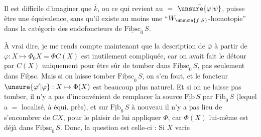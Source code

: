 Il est difficile d'imaginer que $\bar k$, ou ce qui revient au $=$ $\bar{\unsure{\varphi|\psi}}$, puisse être une équivalence, sans qu'il existe au moins une ``$W_{\unsure{f|S}}$-homotopie''
dans la catégorie des endofoncteurs de $\underline{\mathrm{Fibsc}}_0\,S$. 

À vrai dire, je me rends compte maintenant que la description de $\bar\varphi$ à partir de $\varphi:X\longmapsto\Phi_0 X=\Phi C(X)$ est inutilement compliquée, car on avait fait le détour par $C(X)$ uniquement pour être sûr de tomber dans $\underline{\mathrm{Fibsc}}_0\,S$, pas seulement dans $\underline{\mathrm{Fibsc}}$.
Mais si on laisse tomber $\underline{\mathrm{Fibsc}}_0\,S$, on s'en fout, et le foncteur $\unsure{\varphi'|\varphi}:X\mapsto\Phi(X)$ est beaucoup plus naturel. Et  si on ne laisse pas tomber, il n'y a pas d'inconvénient de remplacer la source $\underline{\mathrm{Fib}}\,S$
par $\underline{\mathrm{Fib}}_0\,S$ (lequel a $=$ localisé, à équi. près), et sur $\underline{\mathrm{Fib}}_0\,S$ à nouveau il n'y a pas lieu de s'encombrer de $CX$, pour le plaisir de lui appliquer $\Phi$, car $\Phi(X)$ lui-même est déjà dans $\underline{\mathrm{Fibsc}}_0\,S$. Donc, la question est celle-ci : Si $X$ varie
